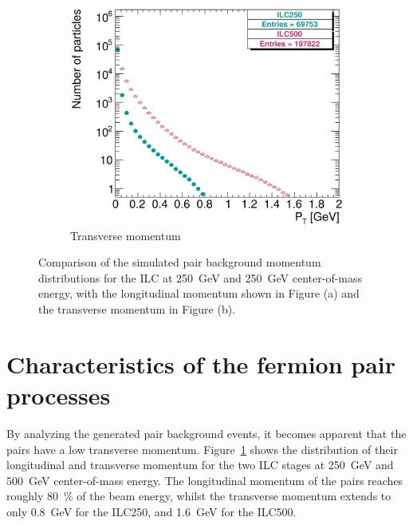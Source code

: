 \begin{figure}[hpt]
\begin{subfigure}[b]{0.49\textwidth}
    \includegraphics[width=\textwidth]{Figures/Pairs/250_500_pairs_comparison_PT.png}
   \caption{Transverse momentum}
   \end{subfigure}
   \caption[Plots of pair background longitudinal and transverse momentum distributions]{Comparison of the simulated pair background momentum distributions for the ILC at \SI[detect-all]{250}{\GeV} and \SI[detect-all]{250}{\GeV} center-of-mass energy, with the longitudinal momentum shown in Figure (a) and the transverse momentum in Figure (b).}
   \label{fig:PairBkgMomentum}
\end{figure}
\FloatBarrier
\section{Characteristics of the fermion pair processes}
\label{PairBkg:helix}
By analyzing the generated pair background events, it becomes apparent that the \positron\electron pairs have a low transverse momentum.
Figure~\ref{fig:PairBkgMomentum} shows the distribution of their longitudinal and transverse momentum for the two ILC stages at \SI{250}{\GeV} and \SI{500}{\GeV} center-of-mass energy.
The longitudinal momentum of the \positron\electron pairs reaches roughly \SI{80}{\percent} of the beam energy, whilst the transverse momentum extends to only \SI{0.8}{\GeV} for the ILC250, and \SI{1.6}{\GeV} for the ILC500.

